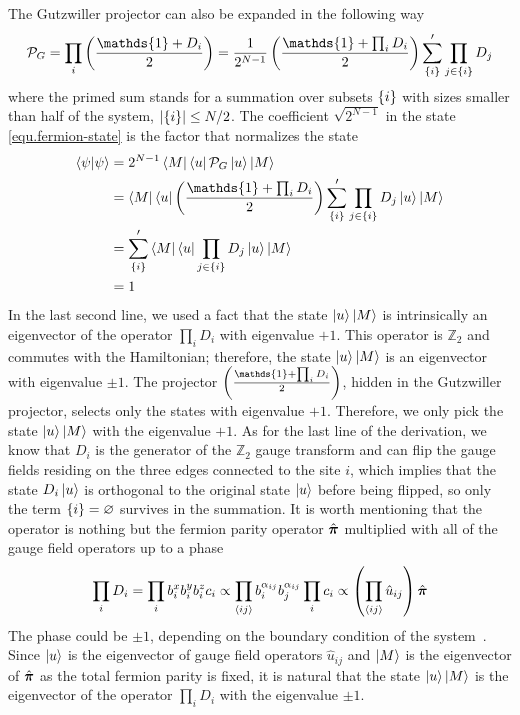 The Gutzwiller projector can also be expanded in the following way~\cite{Pedrocchi-Chesi-Loss_2011, Zschocke-Vojta_2015, Fu-Knolle-Perkins-2018}
\[
\mathcal{P}_G = \prod_{i}\lr{\frac{\mathds{1} + D_i}{2}}= \frac{1}{2^{N-1}}\lr{\frac{\mathds{1} + \prod_iD_i}{2}}\sum_{\lrg{i}}'\prod_{j\in\lrg{i}}D_j
\]
where the primed sum stands for a summation over subsets $\left\{ i \right\}$ with sizes smaller than half of the system, $\abs{\left\{ i \right\}}\leq N/2$. The coefficient $\sqrt{2^{N-1}}$ in the state \eqref{equ.fermion-state} is the factor that normalizes the state
\begin{align*}
    \sbraket{\psi}{\psi} &= 2^{N-1}\bra{M}\bra{u}\mathcal{P}_G\ket{u}\ket{M} \\
    &= \bra{M}\bra{u}\lr{\frac{\mathds{1} + \prod_iD_i}{2}}\sum_{\lrg{i}}'\prod_{j\in\lrg{i}}D_j\ket{u}\ket{M} \\
    &= \sum_{\lrg{i}}'\bra{M}\bra{u}\prod_{j\in\lrg{i}}D_j\ket{u}\ket{M} \\
    &= 1
\end{align*}
In the last second line, we used a fact that the state $\ket{u}\ket{M}$ is intrinsically an eigenvector of the operator $\prod_i D_i$ with eigenvalue $+1$. This operator is $\mathbb{Z}_2$ and commutes with the Hamiltonian; therefore, the state $\ket{u}\ket{M}$ is an eigenvector with eigenvalue $\pm 1$. The projector $\lr{\frac{\mathds{1}+\prod_iD_i}{2}}$, hidden in the Gutzwiller projector, selects only the states with eigenvalue $ +1$. Therefore, we only pick the state $\ket{u}\ket{M}$ with the eigenvalue $+1$. As for the last line of the derivation, we know that $D_i$ is the generator of the $\mathbb{Z}_2$ gauge transform and can flip the gauge fields residing on the three edges connected to the site $i$, which implies that the state $D_i\ket{u}$ is orthogonal to the original state $\ket{u}$ before being flipped, so only the term $\left\{ i \right\}=\varnothing$ survives in the summation. It is worth mentioning that the operator is nothing but the fermion parity operator $\hat{\boldsymbol{\pi}}$ multiplied with all of the gauge field operators up to a phase~\cite{Pedrocchi-Chesi-Loss_2011}
\[
\prod_i D_i = \prod_ib^x_ib^y_ib^z_ic_i \propto \prod_{\left\langle ij \right\rangle}b^{\alpha_{ij}}_{i}b^{\alpha_{ij}}_j\prod_ic_i \propto \left( \prod_{\left\langle ij \right\rangle}\hat{u}_{ij} \right)\hat{\boldsymbol{\pi}}
\]
The phase could be $\pm 1$, depending on the boundary condition of the system~\cite{Pedrocchi-Chesi-Loss_2011, Zschocke-Vojta_2015}. Since $\ket{u}$ is the eigenvector of gauge field operators $\hat{u}_{ij}$ and $\ket{M}$ is the eigenvector of $\hat{\boldsymbol{\pi}}$ as the total fermion parity is fixed, it is natural that the state $\ket{u}\ket{M}$ is the eigenvector of the operator $\prod_i D_i$ with the eigenvalue $\pm 1$.

